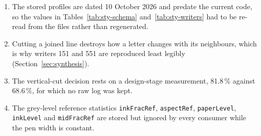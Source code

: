 \begin{enumerate}
\item The stored profiles are dated 10 October 2026 and predate the current code, so the values in Tables~\ref{tab:sty-schema} and~\ref{tab:sty-writers} had to be re-read from the files rather than regenerated.
\item Cutting a joined line destroys how a letter changes with its neighbours, which is why writers 151 and 551 are reproduced least legibly (Section~\ref{sec:synthesis}).
\item The vertical-cut decision rests on a design-stage measurement, 81.8\,\% against 68.6\,\%, for which no raw log was kept.
\item The grey-level reference statistics \texttt{inkFracRef}, \texttt{aspectRef}, \texttt{paperLevel}, \texttt{inkLevel} and \texttt{midFracRef} are stored but ignored by every consumer while the pen width is constant.
\end{enumerate}
